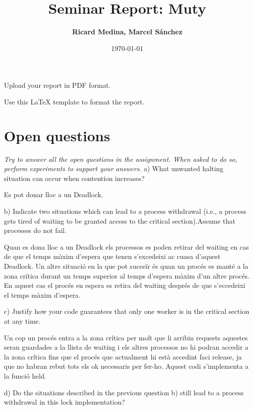 \documentclass[a4paper, 10pt]{article}
\title{Seminar Report: Muty}
\author{\textbf{Ricard Medina, Marcel Sánchez}}
\date{\normalsize\today{}}
\begin{document}
\maketitle

\begin{center}
  Upload your report in PDF format.
  
  Use this LaTeX template to format the report.
\end{center}

\section{Open questions}

\textit{Try to answer all the open questions in the assignment. When asked to do so, perform experiments to support your answers.}
\newline
a) What unwanted halting situation can occur when contention increases?

Es pot donar lloc a un Deadlock.
\newline

b) Indicate two situations which can lead to a process withdrawal (i.e., a
process gets tired of waiting to be granted access to the critical section).Assume that processes do not fail.

Quan es dona lloc a un Deadlock els processos es poden retirar del waiting en cas de que el temps màxim d'espera que tenen s'excedeixi ac cuasa d'aquest Deadlock.
Un altre situació en la que pot succeïr és quan un procés es manté a la zona crítica durant un temps superior al temps d'espera màxim d'un altre procés. En aquest cas el procés en espera es retira del waiting després de que s'eccedeixi el temps màxim d'espera.
\newline

c) Justify how your code guarantees that only one worker is in the critical
section at any time.

Un cop un procés entra a la zona crítica per molt que li arribin requests aquestes seran guardades a la llista de waiting i els altres processos no hi podran accedir a la zona crítica fins que el procés que actualment hi està accedint faci release, ja que no habran rebut tots els ok necessaris per fer-ho. Aquest codi s'implementa a la funció held. 
\newline

d) Do the situations described in the previous question b) still lead to a
process withdrawal in this lock implementation?
\end{document}
